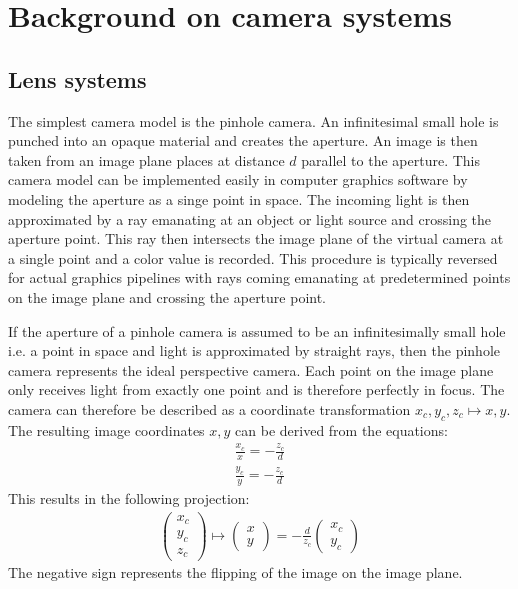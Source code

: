 \chapter{Background on camera systems}
\label{ch:background}

\section{Lens systems}
\label{ch:background-lens}
The simplest camera model is the pinhole camera.
An infinitesimal small hole is punched into an opaque material and creates the aperture.
An image is then taken from an image plane places at distance $d$ parallel to the aperture.
This camera model can be implemented easily in computer graphics software by modeling the aperture as a singe point in space.
The incoming light is then approximated by a ray emanating at an object or light source and crossing the aperture point.
This ray then intersects the image plane of the virtual camera at a single point and a color value is recorded.
This procedure is typically reversed for actual graphics pipelines with rays coming emanating at predetermined points on the image plane and crossing the aperture point.

If the aperture of a pinhole camera is assumed to be an infinitesimally small hole i.e. a point in space and light is approximated by straight rays, then the pinhole camera represents the ideal perspective camera.
Each point on the image plane only receives light from exactly one point and is therefore perfectly in focus.
The camera can therefore be described as a coordinate transformation $x_c, y_c, z_c \mapsto x, y$.
The resulting image coordinates $x, y$ can be derived from the equations:
\begin{align}
    \frac{x_c}{x} = -\frac{z_c}{d} \\
    \frac{y_c}{y} = -\frac{z_c}{d}
\end{align}
This results in the following projection:
\begin{align}
    \begin{pmatrix}
    x_c \\
    y_c \\
    z_c
\end{pmatrix} 
\mapsto
\begin{pmatrix}
    x \\
    y
\end{pmatrix}
= -\frac{d}{z_c}
\begin{pmatrix}
    x_c \\
    y_c
\end{pmatrix}
\end{align}
The negative sign represents the flipping of the image on the image plane. \cite{Beyerer.2016}

